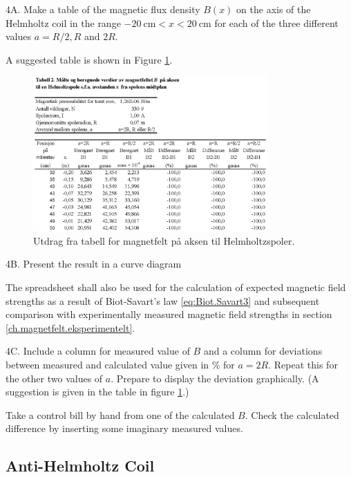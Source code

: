 \documentclass[../Elmag-labhefte-2020.tex]{subfiles}
\begin{document}
{\itsf 4A. Make a table of the magnetic flux density $B(x)$ on the axis of the Helmholtz coil in the range $\SI{-20}{\cm} < x < \SI{20}{\cm}$ for each of the three different values   $a = R/2, R$ and $2R$.}

A suggested table is shown in Figure \ref{magnetfelt.tab2}.

\begin{figure}[!ht]
    \begin{center}
    \includegraphics[width=0.8\textwidth]{fig/magnetfelt-tab2.eps}
    \end{center}
    \caption{%
        Utdrag fra tabell for magnetfelt på aksen til Helmholtzspoler.
    }
    \label{magnetfelt.tab2}
\end{figure}

{\itsf 4B. Present the result in a curve diagram}

The spreadsheet shall also be used for the calculation of expected magnetic field strengths as a result of Biot-Savart's law \eqref{eq:Biot.Savart3} and subsequent comparison with experimentally measured magnetic field strengths in section \ref{ch.magnetfelt.eksperimentelt}.

{\itsf 4C. Include a column for measured value of $B$ and a column for deviations between measured and calculated value given in \si{\percent} for $a = 2R$. Repeat this for the other two values   of $a$. Prepare to display the deviation graphically.} (A suggestion is given in the table in figure \ref{magnetfelt.tab2}.)

Take a control bill by hand from one of the calculated $B$. Check the calculated difference by inserting some imaginary measured values.

\subsection{Anti-Helmholtz Coil}
\end{document}
